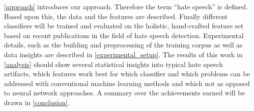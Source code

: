 \autoref{approach} introduces our approach. Therefore the term \enquote{hate speech} is defined. Based upon this, the data and the features are described. Finally different classifiers will be trained and evaluated on the holistic, hand-crafted feature set based on recent pub\-li\-ca\-tions in the field of hate speech detection. 
Experimental details, such as the building and pre\-pro\-cess\-ing of the training corpus as well as data insights are described in \autoref{experimental_setup}.
The results of this work in \autoref{analysis} should show several statistical insights into typical hate speech artifacts, which features work best for which classifier and which problems can be addressed with conventional machine learning methods and which not as opposed to neural network approaches. 
A summary over the achievements earned will be drawn in \autoref{conclusion}.
